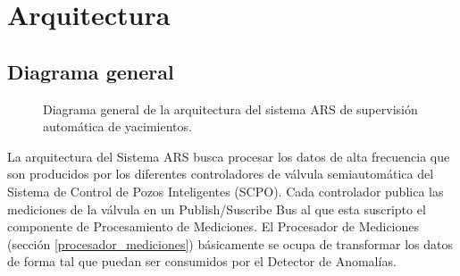 \documentclass{article}
\theoremstyle{definition}
\theoremstyle{remark}
\begin{document}
\pagebreak

\section{Arquitectura}

\subsection{Diagrama general}

\begin{figure}[H]
	\caption{Diagrama general de la arquitectura del sistema ARS de supervisión automática de yacimientos.}
\end{figure}

La arquitectura del Sistema ARS busca procesar los datos de alta frecuencia que son producidos por los diferentes controladores de válvula semiautomática del Sistema de Control de Pozos Inteligentes (SCPO). Cada controlador publica las mediciones de la válvula en un Publish/Suscribe Bus al que esta suscripto el componente de Procesamiento de Mediciones. El Procesador de Mediciones (sección \ref{procesador_mediciones}) básicamente se ocupa de transformar los datos de forma tal que puedan ser consumidos por el Detector de Anomalías.
\end{document}
